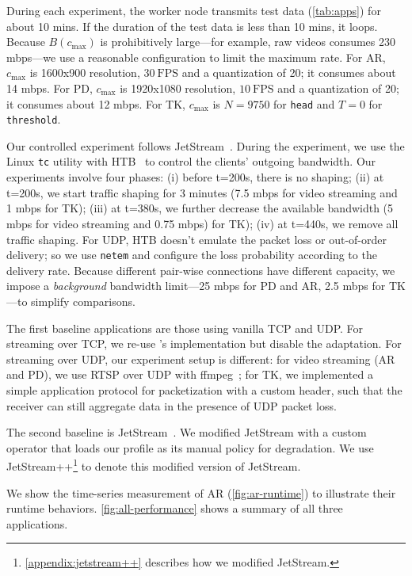During each experiment, the worker node transmits test data (\autoref{tab:apps})
for about 10 mins. If the duration of the test data is less than 10 mins, it
loops. Because $B(c_{\max})$ is prohibitively large---for example, raw videos
consumes 230 mbps---we use a reasonable configuration to limit the maximum
rate. For AR, $c_{\max}$ is 1600x900 resolution, \(30~\text{FPS}\) and a
quantization of 20; it consumes about 14 mbps. For PD, $c_{\max}$ is 1920x1080
resolution, \(10~\text{FPS}\) and a quantization of 20; it consumes about 12
mbps. For TK, $c_{\max}$ is $N=9750$ for \texttt{head} and $T=0$ for
\texttt{threshold}.

Our controlled experiment follows JetStream~\cite{rabkin2014aggregation}. During
the experiment, we use the Linux \texttt{tc} utility with HTB~\cite{htb, lartc}
to control the clients' outgoing bandwidth. Our experiments involve four phases:
(i) before t=200s, there is no shaping; (ii) at t=200s, we start traffic shaping
for 3 minutes (7.5 mbps for video streaming and 1 mbps for TK); (iii) at t=380s,
we further decrease the available bandwidth (5 mbps for video streaming and 0.75
mbps) for TK); (iv) at t=440s, we remove all traffic shaping. For UDP, HTB
doesn't emulate the packet loss or out-of-order delivery; so we use
\texttt{netem} and configure the loss probability according to the delivery
rate. Because different pair-wise connections have different capacity, we impose
a \textit{background} bandwidth limit---25 mbps for PD and AR, 2.5 mbps for
TK---to simplify comparisons.

 The first baseline applications are those using vanilla TCP
and UDP. For streaming over TCP, we re-use \sysname{}'s implementation but
disable the adaptation. For streaming over UDP, our experiment setup is
different: for video streaming (AR and PD), we use RTSP over UDP with
ffmpeg~\cite{bellard2012ffmpeg}; for TK, we implemented a simple application
protocol for packetization with a custom header, such that the receiver can
still aggregate data in the presence of UDP packet loss.

The second baseline is JetStream~\cite{rabkin2014aggregation}. We modified
JetStream with a custom operator that loads our profile as its manual policy for
degradation. We use JetStream++\footnote{\autoref{appendix:jetstream++}
  describes how we modified JetStream.} to denote this modified version of
JetStream.

 We show the time-series measurement of AR
(\autoref{fig:ar-runtime}) to illustrate their runtime
behaviors. \autoref{fig:all-performance} shows a summary of all three
applications. 

